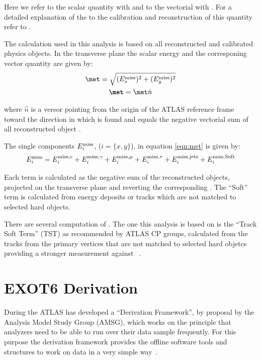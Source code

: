 Here we refer to the scalar quantity with \met and to the vectorial with \textbf{\met}. For a detailed explanation of the  to the calibration and reconstruction of this quantity refer to \cite{met}.

The \met calculation used in this analysis is based on all reconstructed and calibrated physics objects. In the transverse plane the scalar energy and the corresponing vector quantity are given by:
\begin{gather}
\label{eqn:met}
	\met=\sqrt{(E_x^\textup{miss})^2+(E_y^\textup{miss})^2}\\
	\textbf{\met}=\met \hat{n}
\end{gather}

where $\hat{n}$ is a versor pointing from the origin of the ATLAS reference frame toward the direction in which \met is found and equals the negative vectorial sum of all reconstructed object \pt.

The single components $E_i^\textup{miss}$, ($i=\{x,y\}$), in equation \ref{eqn:met} is given by:
\begin{equation}
	E_i^\textup{miss}=E_i^\textup{miss,$e$}+E_i^\textup{miss,$\gamma$}+E_i^\textup{miss,$\mu$}+E_i^\textup{miss,$\tau$}+E_i^\textup{miss,jets}+E_i^\textup{miss,Soft}
\end{equation}

Each term is calculated as the negative sum of the reconstructed objects, projected on the transverse plane and reverting the corresponding \pt. The ``Soft'' term is calculated from energy deposits or tracks which are not matched to selected hard objects. 

There are several computation of \met. The one this analysis is based on is the ``Track Soft Term'' (TST) as recommended by ATLAS CP groups, calculated from the tracks from the primary vertices that are not matched to selected hard objetcs providing a stronger measurement against \pileup~\cite{met}.

\section{EXOT6 Derivation}
\label{sec:derivation}
During the \RunTwo ATLAS has developed a ``Derivation Framework'', by proposal by the Analysis Model Study Group (AMSG), which works on the principle that analyzers need to be able to run over their data sample frequently. For this purpose the derivation framework provides the offline software tools and structures to work on data in a very simple way~\cite{twiki:DAOD}. 

